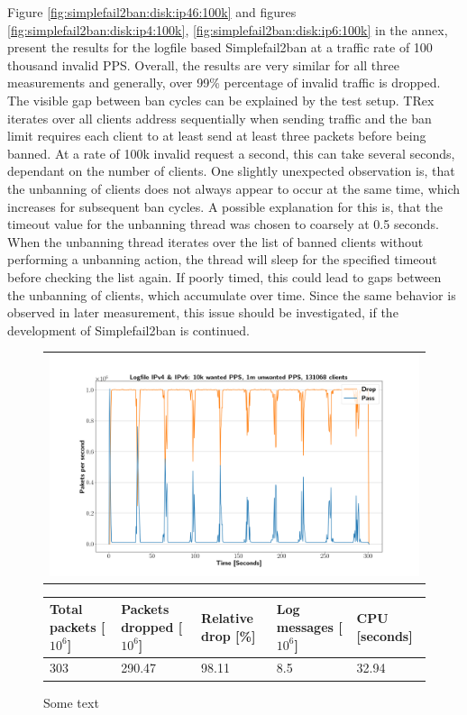 Figure \ref{fig:simplefail2ban:disk:ip46:100k} and figures \ref{fig:simplefail2ban:disk:ip4:100k}, \ref{fig:simplefail2ban:disk:ip6:100k} in the annex, present the results
for the logfile based Simplefail2ban at a traffic rate of 100 thousand invalid \ac{PPS}. Overall, the results are very similar for all three measurements and generally, over 99\% percentage of invalid traffic is dropped.
The visible gap between ban cycles can be explained by the test setup. TRex iterates over all clients address sequentially when sending traffic and the ban limit requires each client to at least
send at  least three packets before being banned. At a rate of 100k invalid request a second, this can take several seconds, dependant on the number of clients.
One slightly unexpected observation is, that the unbanning of clients does not always appear to occur at the same time, which increases for subsequent ban cycles.
A possible explanation for this is, that the timeout value for the unbanning thread was chosen to coarsely at 0.5 seconds. When the unbanning
thread iterates over the list of banned clients without performing a unbanning action, the thread will sleep for the specified timeout
before checking the list again. If poorly timed, this could lead to gaps between the unbanning of clients, which accumulate over time. Since the same
behavior is observed in later measurement, this issue should be investigated, if the development of Simplefail2ban is continued.   \\  

\begin{figure}[!h]
	\centering
	\scriptsize
	\begin{tabular}{c}
    	\centerline{\includegraphics[width=1.2\textwidth]{images/simplefail2ban_disk_ipv46_v10k_iv1m_c131068.png}}
	\end{tabular}
	\begin{tabular}{lllll}
		\toprule
		\textbf{Total packets [$10^6$]} & \textbf{Packets dropped [$10^6$]} & \textbf{Relative drop [\%]} & \textbf{Log messages [$10^6$]} & \textbf{CPU [seconds]} \\ \midrule 
		303 & 290.47 & 98.11 & 8.5 & 32.94 \\
	\bottomrule
	\end{tabular}
	\caption[Simplefail2ban, Logfile IPv4 \& IPv6, 1m \ac{PPS}]{Some text}
	\label{fig:simplefail2ban:disk:ip46:1m}
\end{figure}

